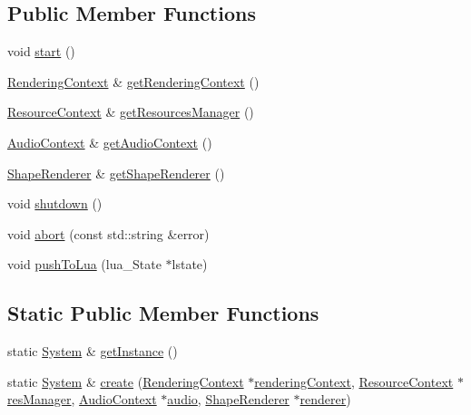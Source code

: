 \subsection*{Public Member Functions}
\begin{DoxyCompactItemize}
\item 
void \hyperlink{classZeta_1_1System_a4df15bace1765af483b834f0a532005a}{start} ()
\item 
\hyperlink{classZeta_1_1RenderingContext}{Rendering\+Context} \& \hyperlink{classZeta_1_1System_a16bf408e9f5a74af163f2b5ce3b281f3}{get\+Rendering\+Context} ()
\item 
\hyperlink{classZeta_1_1ResourceContext}{Resource\+Context} \& \hyperlink{classZeta_1_1System_a2569e9f3aa3c3d1cfe9c1ceab9c58a99}{get\+Resources\+Manager} ()
\item 
\hyperlink{classZeta_1_1AudioContext}{Audio\+Context} \& \hyperlink{classZeta_1_1System_a3c1029b0c434eac250a4639d4e1dbdf6}{get\+Audio\+Context} ()
\item 
\hyperlink{classZeta_1_1ShapeRenderer}{Shape\+Renderer} \& \hyperlink{classZeta_1_1System_a3cfcb9cf93c2078f87a221ff5b9b8eaf}{get\+Shape\+Renderer} ()
\item 
void \hyperlink{classZeta_1_1System_ae54c4f75c927b0aa423286718d51fb9f}{shutdown} ()
\item 
void \hyperlink{classZeta_1_1System_a9c331697b7f1c90e298c426d77bff4f8}{abort} (const std\+::string \&error)
\item 
void \hyperlink{classZeta_1_1System_aa254f4b483da23f65037862c84ad4fdb}{push\+To\+Lua} (lua\+\_\+\+State $\ast$lstate)
\end{DoxyCompactItemize}
\subsection*{Static Public Member Functions}
\begin{DoxyCompactItemize}
\item 
static \hyperlink{classZeta_1_1System}{System} \& \hyperlink{classZeta_1_1System_a092ead3475d9f6696020001e9fe53da9}{get\+Instance} ()
\item 
static \hyperlink{classZeta_1_1System}{System} \& \hyperlink{classZeta_1_1System_aa32e4541ea4281b76834c7e6f94f0a74}{create} (\hyperlink{classZeta_1_1RenderingContext}{Rendering\+Context} $\ast$\hyperlink{classZeta_1_1System_ab9e2c432557b97211aa16f7dbe141935}{rendering\+Context}, \hyperlink{classZeta_1_1ResourceContext}{Resource\+Context} $\ast$\hyperlink{classZeta_1_1System_a303ac11860bb3d3739841d28d067a585}{res\+Manager}, \hyperlink{classZeta_1_1AudioContext}{Audio\+Context} $\ast$\hyperlink{classZeta_1_1System_a61f585e0dc227e82f965dbdb5537e60c}{audio}, \hyperlink{classZeta_1_1ShapeRenderer}{Shape\+Renderer} $\ast$\hyperlink{classZeta_1_1System_a1be4cf982a5738ac3787ed01faed74ab}{renderer})
\end{DoxyCompactItemize}
